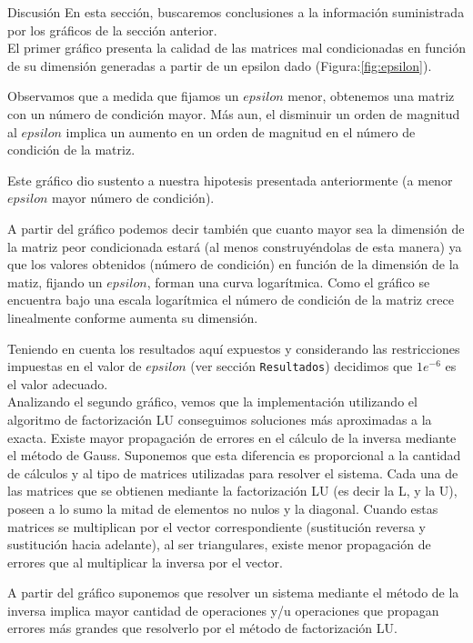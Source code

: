 \begin{section}{Discusión}
	En esta sección, buscaremos conclusiones a la información suministrada por los gráficos de la sección anterior.\\
	
	El primer gráfico presenta la calidad de las matrices mal condicionadas en función de su dimensión generadas a 
	partir de un epsilon dado (Figura:\ref{fig:epsilon}).
	
	Observamos que a medida que fijamos un $epsilon$ menor, obtenemos una matriz con un número de condición mayor. 
	Más aun, el disminuir un orden de magnitud al $epsilon$ implica un aumento en un orden de magnitud en el número
	 de condición de la matriz.
	
	Este gráfico dio sustento a nuestra hipotesis presentada anteriormente (a menor $epsilon$ mayor número de 
	condición).
	
	A partir del gráfico podemos decir también que cuanto mayor sea la dimensión de la  matriz peor condicionada 
	estará (al menos construyéndolas de esta manera) ya que los valores obtenidos (número de condición) en función 
	de la dimensión de la matiz, fijando un $epsilon$, forman una curva logarítmica. Como el gráfico se encuentra 
	bajo una escala logarítmica el número de condición de la matriz crece linealmente conforme aumenta su dimensión.
	
	Teniendo en cuenta los resultados aquí expuestos y considerando las restricciones impuestas en el valor de 
	$epsilon$ (ver sección \texttt{Resultados}) decidimos que $1e^{-6}$ es el valor adecuado.\\
	
	Analizando el segundo gráfico, vemos que la implementación utilizando el algoritmo de factorización LU conseguimos soluciones más aproximadas a la exacta. Existe mayor propagación de errores en el cálculo de la inversa mediante el método de Gauss. Suponemos que esta diferencia es proporcional a la cantidad de cálculos y al tipo de matrices utilizadas para resolver el sistema. Cada una de las matrices que se obtienen mediante la factorización LU (es decir la L, y la U), poseen a lo sumo la mitad de elementos no nulos y la diagonal. Cuando estas matrices se multiplican por el vector correspondiente (sustitución reversa y sustitución hacia adelante), al ser triangulares, existe menor propagación de errores que al multiplicar la inversa por el vector.
	
	A partir del gráfico suponemos que resolver un sistema mediante el método de la inversa implica mayor cantidad de operaciones y/u operaciones que propagan errores más grandes que resolverlo por el método de factorización LU. 
	

\end{section}
